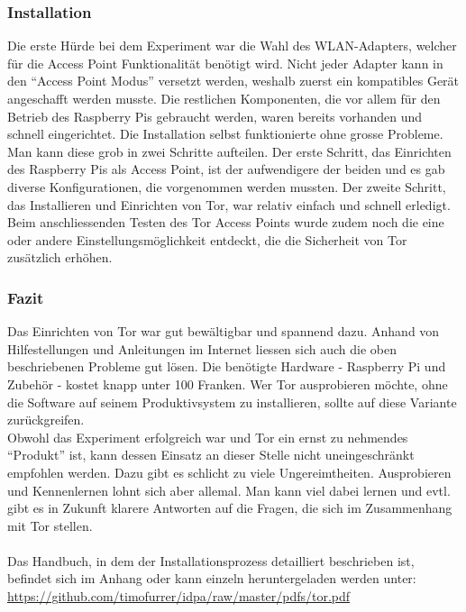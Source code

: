\subsubsection{Installation}
Die erste Hürde bei dem Experiment war die Wahl des WLAN-Adapters, welcher für die Access Point Funktionalität benötigt wird. Nicht jeder Adapter kann in den ``Access Point Modus'' versetzt werden, weshalb zuerst ein kompatibles Gerät angeschafft werden musste. Die restlichen Komponenten, die vor allem für den Betrieb des Raspberry Pis gebraucht werden, waren bereits vorhanden und schnell eingerichtet. Die Installation selbst funktionierte ohne grosse Probleme. Man kann diese grob in zwei Schritte aufteilen. Der erste Schritt, das Einrichten des Raspberry Pis als Access Point, ist der aufwendigere der beiden und es gab diverse Konfigurationen, die vorgenommen werden mussten. Der zweite Schritt, das Installieren und Einrichten von Tor, war relativ einfach und schnell erledigt. Beim anschliessenden Testen des Tor Access Points wurde zudem noch die eine oder andere Einstellungsmöglichkeit entdeckt, die die Sicherheit von Tor zusätzlich erhöhen.

\subsubsection{Fazit}
Das Einrichten von Tor war gut bewältigbar und spannend dazu. Anhand von Hilfestellungen und Anleitungen im Internet liessen sich auch die oben beschriebenen Probleme gut lösen. Die benötigte Hardware - Raspberry Pi und Zubehör - kostet knapp unter 100 Franken. Wer Tor ausprobieren möchte, ohne die Software auf seinem Produktivsystem zu installieren, sollte auf diese Variante zurückgreifen.
\\
Obwohl das Experiment erfolgreich war und Tor ein ernst zu nehmendes ``Produkt'' ist, kann dessen Einsatz an dieser Stelle nicht uneingeschränkt empfohlen werden. Dazu gibt es schlicht zu viele Ungereimtheiten. Ausprobieren und Kennenlernen lohnt sich aber allemal. Man kann viel dabei lernen und evtl. gibt es in Zukunft klarere Antworten auf die Fragen, die sich im Zusammenhang mit Tor stellen.
\\ \\
Das Handbuch, in dem der Installationsprozess detailliert beschrieben ist, befindet sich im Anhang oder kann einzeln heruntergeladen werden unter: \url{https://github.com/timofurrer/idpa/raw/master/pdfs/tor.pdf}
